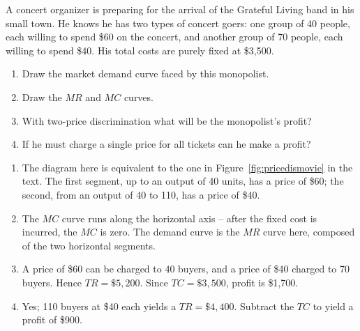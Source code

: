\begin{enumialphparenastyle}
\begin{ex}\label{ex:ch10ex11}
A concert organizer is preparing for the arrival of the Grateful Living band in his small town. He knows he has two types of concert goers: one group of 40 people, each willing to spend \$60 on the concert, and another group of 70 people, each willing to spend \$40. His total costs are purely fixed at \$3,500.
\begin{enumerate}
	\item	Draw the market demand curve faced by this monopolist.
	\item	Draw the $MR$ and $MC$ curves.
	\item	With two-price discrimination what will be the monopolist's profit?
	\item	If he must charge a single price for all tickets can he make a profit?
\end{enumerate}
\begin{sol}
\begin{enumerate}
	\item	The diagram here is equivalent to the one in Figure~\ref{fig:pricedismovie} in the text. The first segment, up to an output of 40 units, has a price of \$60; the second, from an output of 40 to 110, has a price of \$40.
	\item	The $MC$ curve runs along the horizontal axis -- after the fixed cost is incurred, the $MC$ is zero. The demand curve is the $MR$ curve here, composed of the two horizontal segments.
	\item	A price of \$60 can be charged to 40 buyers, and a price of \$40 charged to 70 buyers. Hence $TR=\$5,200$. Since $TC=\$3,500$, profit is \$1,700.
	\item	Yes; 110 buyers at \$40 each yields a $TR=\$4,400$. Subtract the $TC$ to yield a profit of \$900.
\end{enumerate}
\begin{center}
\end{center}
\end{sol}
\end{ex}


\end{enumialphparenastyle}
